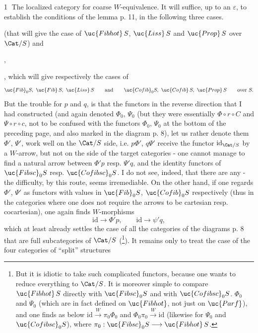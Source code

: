 \textcircled{1} The localized category for coarse $W$-equivalence. It will suffice, up to an $\varepsilon$, to establish the conditions of the lemma p. 11, in the following three cases.
(that will give the case of $\uc{Fibhot}\,S$, $\uc{Liss}\,S$ and $\uc{Prop}\,S$ over $\Cat/S$) and
,
,
which will give respectively the cases of
\[
\uc{Fib}_0S,\ \uc{Fib}\,S,\ \uc{Liss}\,S \qquad \text{and} \qquad \uc{Cofib}_0S,\ \uc{Cofib}\,S,\ \uc{Prop}\,S \qquad \text{over } S.
\]
But the trouble for $p$ and $q$, is that the functors in the reverse direction that I had constructed (and again denoted $\Phi_0$, $\Psi_0$ (but they were essentially $\Phi\circ r\circ C$ and $\Psi\circ r\circ c$, not to be confused with the functors $\Phi_0$, $\Psi_0$ at the bottom of the preceding page, and also marked in the diagram p. 8), let us rather denote them $\Phi'$, $\Psi'$, work well on the $\Cat/S$ side, i.e. $p\Phi'$, $q\Psi'$ receive the functor $\mathrm{id}_{\Cat/S}$ by a $W$-arrow, but not on the side of the target categories - one cannot manage to find a natural arrow between $\Phi'p$ resp. $\Psi'q$, and the identity functors of $\uc{Fibsc}_0S$ resp. $\uc{Cofibsc}_0S$. I do
not see, indeed, that there are any - the difficulty, by this route, seems irremediable. On the other hand, if one regards $\Phi'$, $\Psi'$ as functors with values in $\uc{Fib}_0S$, $\uc{Cofib}_0S$ respectively (thus in the categories where one does not require the arrows to be cartesian resp. cocartesian), one again finds $W$-morphisms %
\[
\mathrm{id} \longrightarrow \Phi'p, \qquad \mathrm{id} \longrightarrow \psi'q, %
\]
which at least already settles the case of all the categories of the diagrams p. 8 that are
full subcategories of $\Cat/S$ (\footnote[36]{But it is idiotic to take such complicated functors, because one wants to reduce everything to $\Cat/S$. It is moreover simple to compare $\uc{Fibhot}\,S$ directly with $\uc{Fibsc}_0S$ and with $\uc{Cofibsc}_0S$. $\Phi_0$ and $\Psi_0$ (which are in fact defined on $\uc{Fibhot}$, not just on $\uc{Parf}$), and one finds as below $\mathrm{id} \xrightarrow{W} \pi_0\Phi_0$ and $\Phi_0\pi_0 \xrightarrow{W} \mathrm{id}$ (likewise for $\Psi_0$ and $\uc{Cofibsc}_0S$), where $\pi_0 : \uc{Fibsc}_0S \longrightarrow \uc{Fibhot}\,S$.}). It remains only to treat the case of the four categories of ``split'' structures
